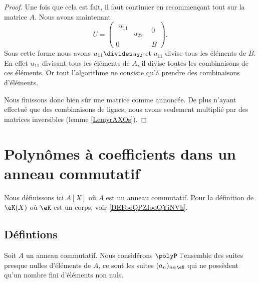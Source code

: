 \begin{proof}
    Une fois que cela est fait, il faut continuer en recommençant tout sur la matrice \( A\). Nous avons maintenant
    \begin{equation}
        U=\begin{pmatrix}
            \begin{matrix}
                u_{11}  &       \\ 
                &   u_{22}    
            \end{matrix}&   0    \\ 
            0    &   B    
        \end{pmatrix}.
    \end{equation}
    Sous cette forme nous avons \( u_{11}\divides u_{22}\) et \( u_{11}\) divise tous les éléments de \( B\). En effet \( u_{11}\) divisant tous les éléments de \( A\), il divise toutes les combinaisons de ces éléments. Or tout l'algorithme ne consiste qu'à prendre des combinaisons d'éléments.

    Nous finissons donc bien sûr une matrice comme annoncée. De plus n'ayant effectué que des combinaisons de lignes, nous avons seulement multiplié par des matrices inversibles (lemme \ref{LemyrAXQs}).
\end{proof}

\section{Polynômes à coefficients dans un anneau commutatif}
\label{SECooVMABooVdhbPo}

Nous définissons ici \( A[X]\) où \( A\) est un anneau commutatif. Pour la définition de \( \eK(X)\) où \( \eK\) est un corps, voir \ref{DEFooQPZIooQYiNVh}.

\subsection{Défintions}

Soit \( A\) un anneau commutatif. Nous considérons \( \polyP\) l'ensemble des suites presque nulles d'éléments de \( A\), ce sont les suites \( (a_n)_{n\in\eN}\) qui ne possèdent qu'un nombre fini d'éléments non nuls.

